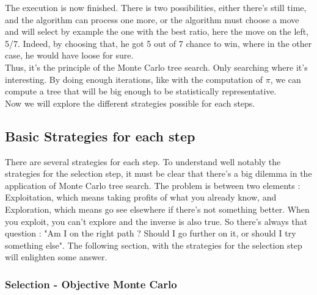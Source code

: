 \begin{center}
\end{center}

The execution is now finished. There is two possibilities, either there's still time, and the algorithm can process one more, or the algorithm must choose a move and will select by example the one with the best ratio, here the move on the left, 5/7. Indeed, by choosing that, he got 5 out of 7 chance to win, where in the other case, he would have loose for sure. 
\\

Thus, it's the principle of the Monte Carlo tree search. Only searching where it's interesting. By doing enough iterations, like with the computation of $\pi$, we can compute a tree that will be big enough to be statistically representative. 
\\

Now we will explore the different strategies possible for each steps. 

\subsection{Basic Strategies for each step}

There are several strategies for each step. To understand well notably the strategies for the selection step, it must be clear that there's a big dilemma in the application of Monte Carlo tree search. The problem is between two elements : Exploitation, which means taking profits of what you already know, and Exploration, which means go see elsewhere if there's not something better. When you exploit, you can't explore and the inverse is also true. So there's always that question : "Am I on the right path ? Should I go further on it, or should I try something else". 
The following section, with the strategies for the selection step will enlighten some answer. 

\subsubsection{Selection - Objective Monte Carlo}

